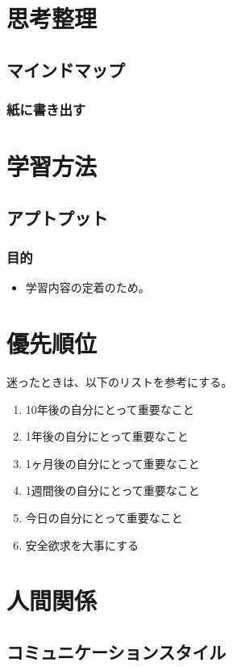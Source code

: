\documentclass[dvipdfmx]{jlreq}
\begin{document}
\section{思考整理}
    \subsection{マインドマップ}
        \subsubsection{紙に書き出す}
\section{学習方法}
    \subsection{アプトプット}
        \subsubsection{目的}
        \begin{itemize}
            \item 学習内容の定着のため。
        \end{itemize}



\section{優先順位}
    迷ったときは、以下のリストを参考にする。
    \begin{enumerate}
        \item 10年後の自分にとって重要なこと
        \item 1年後の自分にとって重要なこと
        \item 1ヶ月後の自分にとって重要なこと
        \item 1週間後の自分にとって重要なこと
        \item 今日の自分にとって重要なこと
        \item 安全欲求を大事にする
    \end{enumerate}

\section{人間関係}
    \subsection{コミュニケーションスタイル}
\end{document}
